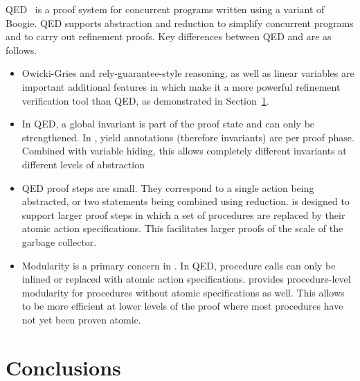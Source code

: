 QED~\cite{QEDRef} is a proof system for concurrent programs written using a variant of Boogie. QED supports abstraction and reduction to simplify concurrent programs and to carry out refinement proofs. Key differences between QED and \civl are as follows.
\begin{itemize}
\item Owicki-Gries and rely-guarantee-style reasoning, as well as linear variables are important additional features in \civl which make it a more powerful refinement verification tool than QED, as demonstrated in Section~\ref{}. 
\item In QED, a global invariant is part of the proof state and can only be strengthened. In \civl, yield annotations (therefore invariants) are per proof phase. Combined with variable hiding, this allows completely different invariants at different levels of abstraction
\item QED proof steps are small. They correspond to a single action being abstracted, or two statements being combined using reduction. \civl is designed to support larger proof steps in which a set of procedures are replaced by their atomic action specifications. This facilitates larger proofs of the scale of the garbage collector.  
\item Modularity is a primary concern in \civl. In QED, procedure calls can only be inlined or replaced with atomic action specifications. \civl provides procedure-level modularity for procedures without atomic specifications as well. This allows \civl to be more efficient at lower levels of the proof where most procedures have not yet been proven atomic. 
\end{itemize}

\section{Conclusions}

